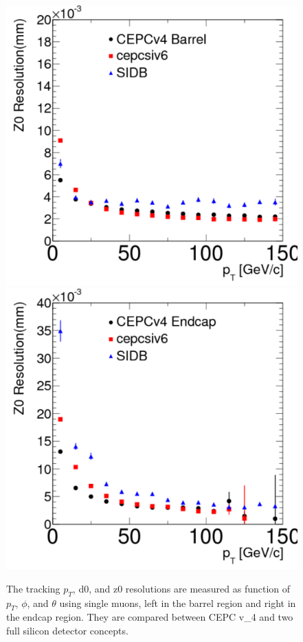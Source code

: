 \begin{figure}[hbtp]
\begin{center}
\includegraphics[width=0.25\textheight,keepaspectratio]{Figures/TrackingSystem/FullSilicon/Plot_muon_Z0_PtBarrel.pdf}
\includegraphics[width=0.25\textheight,keepaspectratio]{Figures/TrackingSystem/FullSilicon/Plot_muon_Z0_PtEndcap.pdf}
\caption{The tracking $p_T$, d0, and z0 resolutions are measured as function of $p_T$, $\phi$, and $\theta$ using single muons, 
left in the barrel region and right in the endcap region. They are compared between CEPC v\_4 and two full silicon detector concepts.\label{fig:detptd0z0}}
\end{center}
\end{figure}
 

